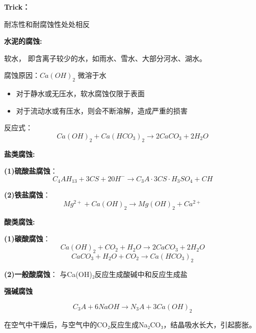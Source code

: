\documentclass[12pt, a4paper, oneside, UTF8]{ctexbook}
\begin{document}
\begin{table}[ht]
	\centering
	\caption{含活性骨料的水泥} \label{table:cement}
\end{table}

\textbf{Trick：}

耐冻性和耐腐蚀性处处相反

\textbf{水泥的腐蚀:}

软水， 即含离子较少的水，如雨水、雪水、大部分河水、湖水。

腐蚀原因：$Ca(OH)_2$ 微溶于水

\begin{itemize}
	\item 对于静水或无压水，软水腐蚀仅限于表面
	\item 对于流动水或有压水，则会不断溶解，造成严重的损害
\end{itemize}

反应式： 
\[
Ca(OH)_2 + Ca(HCO_3)_2 \rightarrow 2CaCO_3 + 2H_2O
\]

\textbf{盐类腐蚀:}

\textbf{(1)硫酸盐腐蚀}：
\[
C_4AH_{13} + 3CS + 20H^- \rightarrow C_3A \cdot 3CS \cdot H_3SO_4 + CH
\]

\textbf{(2)铁盐腐蚀}：
\[
Mg^{2+} + Ca(OH)_2 \rightarrow Mg(OH)_2 + Ca^{2+}
\]

\textbf{酸类腐蚀:}

\textbf{(1)碳酸腐蚀}：
\[
Ca(OH)_2 + CO_2 + H_2O \rightarrow 2CaCO_3 + 2H_2O
\]
\[
CaCO_3 + H_2O + CO_2 \rightarrow Ca(HCO_3)_2
\]

\textbf{(2)一般酸腐蚀}：
与Ca(OH)₂反应生成酸碱中和反应生成盐

\textbf{强碱腐蚀}

\[
C_3A + 6NaOH \rightarrow N_3A + 3Ca(OH)_2
\]

在空气中干燥后，与空气中的CO₂反应生成Na₂CO₃，结晶吸水长大，引起膨胀。
\end{document}

